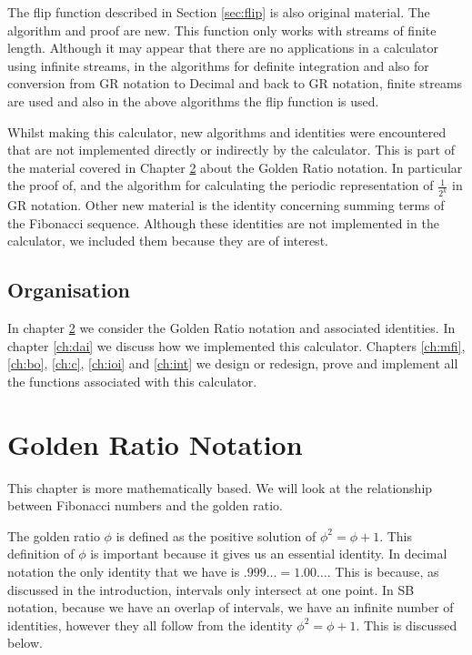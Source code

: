 \documentclass{cs4rep}
\begin{document}
The flip function described in Section \ref{sec:flip} is also original
material. The algorithm and proof are new. This function only works
with streams of finite length.  Although it may appear that there are
no applications in a calculator using infinite streams, in the
algorithms for definite integration and also for conversion from GR
notation to Decimal and back to GR notation, finite streams are used
and also in the above algorithms the flip function is used.

Whilst making this calculator, new algorithms and identities were
encountered that are not implemented directly or indirectly by the
calculator. This is part of the material covered in Chapter
\ref{ch:grn} about the Golden Ratio notation. In particular the proof
of, and the algorithm for calculating the periodic representation of $
\frac{1}{2^{k}} $ in GR notation. Other new material is the identity
concerning summing terms of the Fibonacci sequence.  Although these
identities are not implemented in the calculator, we included them
because they are of interest.



\section{Organisation}
In chapter \ref{ch:grn} we consider the Golden Ratio notation and
associated identities.  In chapter \ref{ch:dai} we discuss how we
implemented this calculator.  Chapters \ref{ch:mfi}, \ref{ch:bo},
\ref{ch:c}, \ref{ch:ioi} and \ref{ch:int} we design or redesign, prove
and implement all the functions associated with this calculator.



\chapter{Golden Ratio Notation}\label{ch:grn}

This chapter is more mathematically based. We will look at the
relationship between Fibonacci numbers and the golden ratio.

The golden ratio $\phi$ is defined as the positive solution of
$\phi^{2}=\phi+1$.  This definition of $\phi$ is important because it
gives us an essential identity. In decimal notation the only identity
that we have is $.999 \ldots = 1.00 \ldots$. This is because, as
discussed in the introduction, intervals only intersect at one point.
In SB notation, because we have an overlap of intervals, we have an
infinite number of identities, however they all follow from the
identity $\phi^{2}=\phi+1$. This is discussed below.
\end{document}
